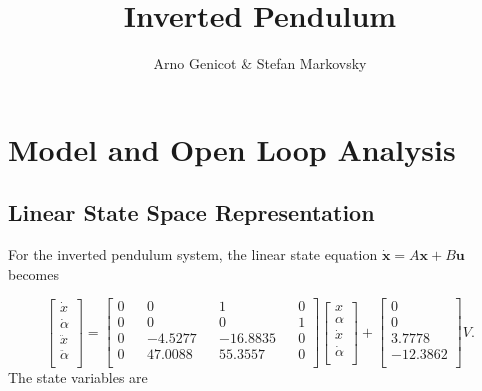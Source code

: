 \documentclass[a4paper,10pt]{article}
\title{Inverted Pendulum}
\author{Arno Genicot \& Stefan Markovsky}
\theoremstyle{bluehomework}
\numberwithin{equation}{section}
\begin{document}
\selectfont{}

\maketitle

\section{Model and Open Loop Analysis}

\subsection{Linear State Space Representation}

For the inverted pendulum system, the linear state equation $\dot{\mathbf{x}} = A\mathbf{x} + B\mathbf{u}$ becomes 

\begin{equation} \label{eq:state_eq}
  \begin{bmatrix} 
    \dot{x} \\
    \dot{\alpha} \\
    \ddot{x} \\
    \ddot{\alpha} \\  
  \end{bmatrix}
  = 
  \begin{bmatrix} 
    0 && 0 && 1 && 0 \\
    0 && 0 && 0 && 1 \\
    0 && -4.5277 && -16.8835 && 0 \\
    0 && 47.0088 && 55.3557 && 0 \\
  \end{bmatrix}
  \begin{bmatrix} 
    x \\
    \alpha \\
    \dot{x} \\
    \dot{\alpha} \\  
  \end{bmatrix} 
  + 
  \begin{bmatrix}
    0 \\
    0 \\
    3.7778 \\
    -12.3862 \\
  \end{bmatrix}V.
\end{equation}
The state variables are 
\end{document}
